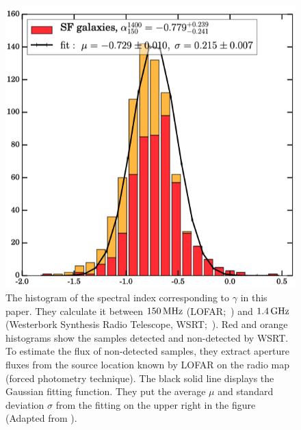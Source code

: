 \begin{figure}[htbp]
	\centering
	\includegraphics[width=.7\linewidth]{Chapter_6/Figures/CalistroRivera2017_Figure7.png}
    \caption[The histogram of the spectral index in \citet{CalistroRivera2017a}]{\label{fig:CalistroRivera2017_figure7}
        The histogram of the spectral index corresponding to $\gamma$ in this paper.
        They calculate it between $150\,\mathrm{MHz}$ (LOFAR;~\citealt{Williams2016}) and $1.4\,\mathrm{GHz}$ (Westerbork Synthesis Radio Telescope, WSRT;~\citealt{DeVries2002}).
        Red and orange histograms show the samples detected and non-detected by WSRT\@.
        To estimate the flux of non-detected samples, they extract aperture fluxes from the source location known by LOFAR on the radio map (forced photometry technique).
        The black solid line displays the Gaussian fitting function.
        They put the average $\mu$ and standard deviation $\sigma$ from the fitting on the upper right in the figure
        (Adapted from \citet{CalistroRivera2017a}).
    }
\end{figure}


